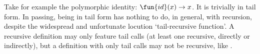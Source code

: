 Take for example the polymorphic identity: \(\fun{id}(x) \rightarrow
x\). It is trivially in tail form. In passing, being in tail form has
nothing to do, in general, with recursion, despite the widespread and
unfortunate locution `tail\hyp{}recursive function'. A recursive
definition may only feature tail calls (at least one recursive,
directly or indirectly), but a definition with only tail calls may not
be recursive, like .
